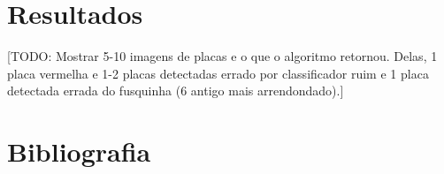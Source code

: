 \documentclass{lista}
\begin{document}
\section{Resultados}
[TODO: Mostrar 5-10 imagens de placas e o que o algoritmo retornou.
Delas, 1 placa vermelha e 1-2 placas detectadas errado por classificador
ruim e 1 placa detectada errada do fusquinha (6 antigo mais arrendondado).]

\newpage
\section*{Bibliografia}
\end{document}
